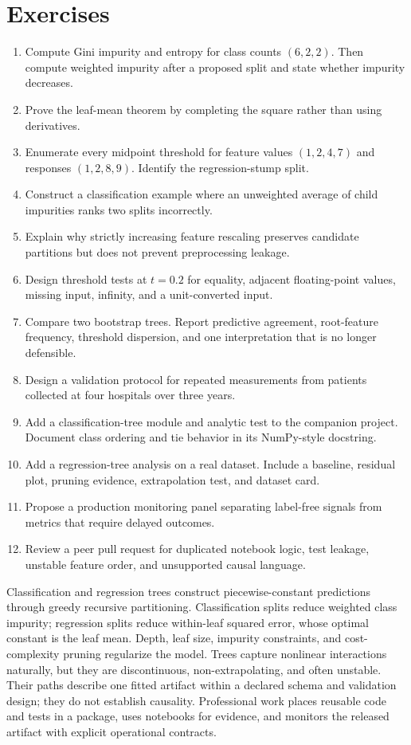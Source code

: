 \section{Exercises}
\begin{enumerate}
  \item Compute Gini impurity and entropy for class counts $(6,2,2)$. Then
  compute weighted impurity after a proposed split and state whether impurity
  decreases.
  \item Prove the leaf-mean theorem by completing the square rather than using
  derivatives.
  \item Enumerate every midpoint threshold for feature values
  $(1,2,4,7)$ and responses $(1,2,8,9)$. Identify the regression-stump split.
  \item Construct a classification example where an unweighted average of
  child impurities ranks two splits incorrectly.
  \item Explain why strictly increasing feature rescaling preserves candidate
  partitions but does not prevent preprocessing leakage.
  \item Design threshold tests at $t=0.2$ for equality, adjacent floating-point
  values, missing input, infinity, and a unit-converted input.
  \item Compare two bootstrap trees. Report predictive agreement, root-feature
  frequency, threshold dispersion, and one interpretation that is no longer
  defensible.
  \item Design a validation protocol for repeated measurements from patients
  collected at four hospitals over three years.
  \item Add a classification-tree module and analytic test to the companion
  project. Document class ordering and tie behavior in its NumPy-style
  docstring.
  \item Add a regression-tree analysis on a real dataset. Include a baseline,
  residual plot, pruning evidence, extrapolation test, and dataset card.
  \item Propose a production monitoring panel separating label-free signals
  from metrics that require delayed outcomes.
  \item Review a peer pull request for duplicated notebook logic, test leakage,
  unstable feature order, and unsupported causal language.
\end{enumerate}

\begin{chapterreview}
Classification and regression trees construct piecewise-constant predictions
through greedy recursive partitioning. Classification splits reduce weighted
class impurity; regression splits reduce within-leaf squared error, whose
optimal constant is the leaf mean. Depth, leaf size, impurity constraints, and
cost-complexity pruning regularize the model. Trees capture nonlinear
interactions naturally, but they are discontinuous, non-extrapolating, and
often unstable. Their paths describe one fitted artifact within a declared
schema and validation design; they do not establish causality. Professional
work places reusable code and tests in a package, uses notebooks for evidence,
and monitors the released artifact with explicit operational contracts.
\end{chapterreview}

